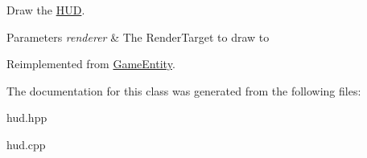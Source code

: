 Draw the \mbox{\hyperlink{class_h_u_d}{H\+UD}}. 


\begin{DoxyParams}{Parameters}
{\em renderer} & The Render\+Target to draw to \\
\hline
\end{DoxyParams}


Reimplemented from \mbox{\hyperlink{class_game_entity_ae8417c4fa668594827706c44091f7366}{Game\+Entity}}.



The documentation for this class was generated from the following files\+:\begin{DoxyCompactItemize}
\item 
hud.\+hpp\item 
hud.\+cpp\end{DoxyCompactItemize}

